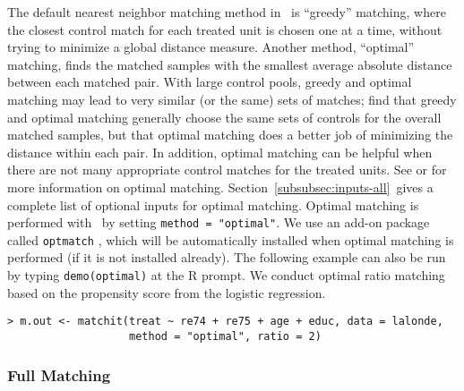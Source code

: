 The default nearest neighbor matching method in \MatchIt\ is
``greedy'' matching, where the closest control match for each treated
unit is chosen one at a time, without trying to minimize a global
distance measure.  Another method, ``optimal'' matching, finds the
matched samples with the smallest average absolute distance between
each matched pair.  With large control pools, greedy and optimal
matching may lead to very similar (or the same) sets of matches;
\citet{GuRos93} find that greedy and optimal matching generally choose
the same sets of controls for the overall matched samples, but that
optimal matching does a better job of minimizing the distance within
each pair.  In addition, optimal matching can be helpful when there
are not many appropriate control matches for the treated units.  See
\cite{GuRos93} or \cite{Rosenbaum02} for more information on optimal
matching.
Section~\ref{subsubsec:inputs-all}~gives a complete list of optional inputs for optimal matching.  Optimal
matching is performed with \MatchIt\ by setting \texttt{method =
  "optimal"}.  We use an add-on package called \texttt{optmatch}
\citep{Hansen04}, which will be automatically installed when optimal
matching is performed (if it is not installed already).  The following
example can also be run by typing {\tt demo(optimal)} at the R prompt.
We conduct optimal ratio matching based on the propensity score from
the logistic regression.
\begin{verbatim}
> m.out <- matchit(treat ~ re74 + re75 + age + educ, data = lalonde, 
                   method = "optimal", ratio = 2)
\end{verbatim}

\subsubsection{Full Matching}
\label{subsubsec:full}

